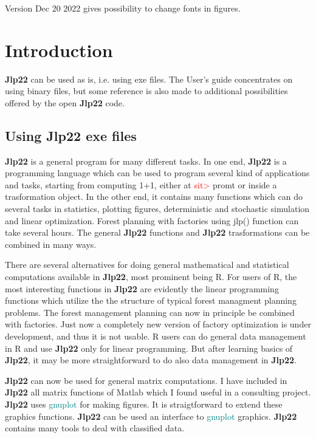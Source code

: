 Version Dec 20 2022 gives possibility to change fonts in figures. 
 
\section{Introduction} 
\label{intro} 
\textbf{Jlp22} can be used as is, i.e. using exe files. The User's guide concentrates 
on using binary files, but some reference is also made to additional possibilities offered 
by the open \textbf{Jlp22} code. 
\subsection{Using \textbf{Jlp22} exe files} 
\label{intro1} 
\textbf{Jlp22} is a general program for many different tasks. In one end, \textbf{Jlp22} is a programming language which 
can be used to program several kind of applications and tasks, starting from computing 1+1, either 
at \textcolor{Red}{sit>} promt or inside a trasformation object. 
In the other end, it contains many functions which 
can do several tasks in statistics, plotting figures, 
deterministic and stochastic simulation and linear optimization. Forest planning with factories 
using \textcolor{VioletRed}{jlp}() function can take several hours. 
The general \textbf{Jlp22} functions and \textbf{Jlp22} trasformations can be combined in many ways. 
 
There are several alternatives for doing general mathematical and statistical 
computations available in \textbf{Jlp22}, most prominent being R. For  users of R, the most interesting 
functions in \textbf{Jlp22} are evidently the linear programming functions which utilize the the structure 
of typical forest managment planning problems. The forest management planning can now 
in principle be combined with factories. Just now a completely new version of factory optimization 
is under development, and thus it is not usable. R users can do general data management in R and use 
\textbf{Jlp22} only for linear programming. But after learning basics of \textbf{Jlp22}, it may be more 
straightforward to do also data management in \textbf{Jlp22}. 
 
\textbf{Jlp22} can now be used for general matrix computations. I have included in \textbf{Jlp22} all matrix functions of 
Matlab which I found useful in a consulting project. \textbf{Jlp22} uses \textcolor{teal}{gnuplot} for making figures. 
It is straigtforward to extend these graphics functions. \textbf{Jlp22} can be used an 
interface to \textcolor{teal}{gnuplot} graphics.  \textbf{Jlp22} contains many tools to deal with classified data. 
 

